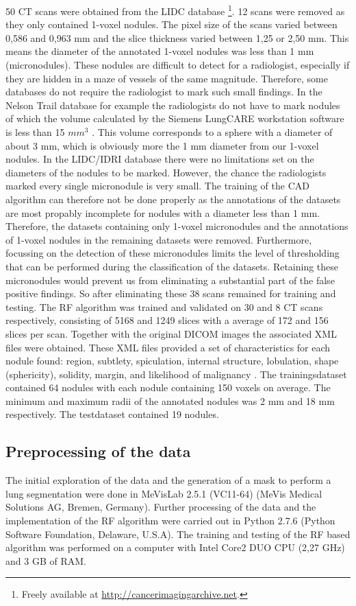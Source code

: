 50 CT scans were obtained from the LIDC database \footnote{Freely available
at \url{http://cancerimagingarchive.net}.}. 12 scans were removed as they only
contained 1-voxel nodules. The pixel size of the scans varied between 0,586 and
0,963 mm and the slice thickness varied between 1,25 or 2,50 mm. This means the
diameter of the annotated 1-voxel nodules was less than 1 mm (micronodules).
These nodules are difficult to detect for a radiologist, especially if they are
hidden in a maze of vessels of the same magnitude. Therefore, some databases do
not require the radiologist to mark such small findings. In the Nelson Trail
database for example the radiologists do not have to mark nodules of which the
volume calculated by the Siemens LungCARE workstation software is less than 15
$mm^3$ \cite{mur}. This volume corresponds to a sphere with a diameter of about
3 mm, which is obviously more the 1 mm diameter from our 1-voxel nodules.
In the LIDC/IDRI database there were no limitations set on the diameters of the
nodules to be marked. However, the chance the radiologists marked every single
micronodule is very small. The training of the CAD algorithm can therefore not
be done properly as the annotations of the datasets are most propably incomplete
for nodules with a diameter less than 1 mm. Therefore, the datasets containing
only 1-voxel micronodules and the annotations of 1-voxel nodules in the
remaining datasets were removed. Furthermore, focussing on the detection of
these micronodules limits the level of thresholding that can be performed during
the classification of the datasets. Retaining these micronodules would prevent
us from eliminating a substantial part of the false positive findings. So
after eliminating these 38 scans remained for training and testing.
The RF algorithm was trained and validated on 30 and 8 CT scans respectively,
consisting of 5168 and 1249 slices with a average of 172 and 156 slices per
scan. Together with the original DICOM images the associated XML files
were obtained. These XML files provided a set of characteristics for each nodule
found: region, subtlety, spiculation, internal structure, lobulation, shape
(sphericity), solidity, margin, and likelihood of malignancy \cite{lidcbase}.
The trainingsdataset contained 64 nodules with each nodule containing 150 voxels
on average. The minimum and maximum radii of the annotated nodules was 2 mm and
18 mm respectively. The testdataset contained 19 nodules.


\subsection{Preprocessing of the data}
The initial exploration of the data and the generation of a mask to perform a
lung segmentation were done in MeVisLab 2.5.1 (VC11-64) (MeVis Medical Solutions
AG, Bremen, Germany). Further processing of the data and the implementation of
the RF algorithm were carried out in Python 2.7.6 (Python Software Foundation,
Delaware, U.S.A).  The training and testing of the RF based algorithm was
performed on a computer with Intel Core2 DUO CPU (2,27 GHz) and 3 GB of RAM.

